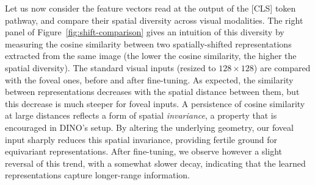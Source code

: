 \documentclass{article}
\begin{document}
Let us now consider the feature vectors read at the output of the [CLS] token pathway, and compare their spatial diversity across visual modalities. The right panel of Figure~\ref{fig:shift-comparison} gives an intuition of this diversity by measuring the cosine similarity between two spatially-shifted representations extracted from the same image (the lower the cosine similarity, the higher the spatial diversity). The standard visual inputs (resized to $128\times128$) are compared with the foveal ones, before and after fine-tuning. As expected, the similarity between representations decreases with the spatial distance between them, but this decrease is much steeper for foveal inputs. A persistence of cosine similarity at large distances reflects a form of spatial \emph{invariance}, a property that is encouraged in DINO's setup. By altering the underlying geometry, our foveal input sharply reduces this spatial invariance, providing fertile ground for equivariant representations. After fine-tuning, we observe however a slight reversal of this trend, with a somewhat slower decay, indicating that the learned representations capture longer-range information.
\end{document}
